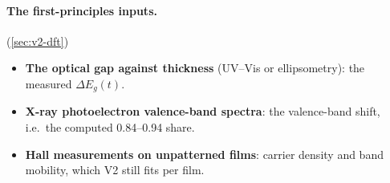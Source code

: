 \paragraph{The first-principles inputs.} (\cref{sec:v2-dft})
\begin{itemize}
\item \textbf{The optical gap against thickness} (UV--Vis or ellipsometry): the measured $\Delta E_g(t)$.
\item \textbf{X-ray photoelectron valence-band spectra}: the valence-band shift, i.e.\ the computed 0.84--0.94 share.
\item \textbf{Hall measurements on unpatterned films}: carrier density and band mobility, which V2 still fits per film.
\end{itemize}
